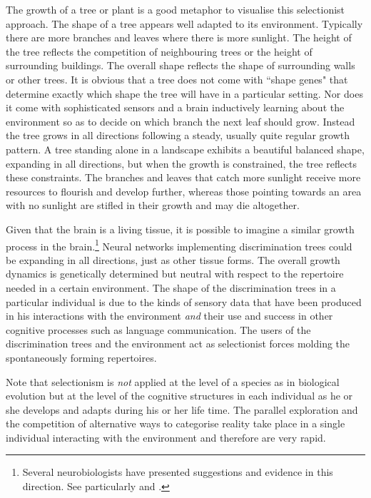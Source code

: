 The growth of a tree or plant is a good 
metaphor to visualise this selectionist approach. 
The shape of a tree appears well adapted to 
its environment. Typically there are more branches and leaves 
where there is more sunlight. The height of
the tree reflects the competition of neighbouring trees
or the height of surrounding buildings. The overall shape reflects
the shape of surrounding walls or other trees. 
It is obvious that a tree
does not come with ``shape genes" that determine
exactly which shape the tree will have in a particular 
setting. Nor does it come with sophisticated sensors
and a brain inductively learning about the environment
so as to decide on which branch the next leaf should grow. 
Instead the tree grows in all directions following
a steady, usually quite regular growth pattern. A tree
standing alone in a landscape exhibits a beautiful 
balanced shape, expanding in all directions, but when the 
growth is constrained, the tree reflects these constraints. 
The branches and leaves that catch more sunlight receive more resources 
to flourish and develop further, whereas those 
pointing towards an area with no sunlight are stifled in 
their growth and may die altogether.  

Given that the brain is a living tissue, it is possible 
to imagine a similar growth process in the brain.\footnote{
Several neurobiologists have presented 
suggestions and evidence in this direction. See 
particularly \cite{Edelman:1987} and \cite{Changeux:1997}.}
Neural networks implementing discrimination trees could be expanding
in all directions, just as other
tissue forms. The overall growth dynamics is 
genetically determined but neutral with respect to 
the repertoire needed in a certain environment. 
The shape of the discrimination trees in a particular 
individual is due to the kinds of sensory 
data that have been produced in his interactions with
the environment {\itshape and} their use and success
in other cognitive processes such as language
communication. The
users of the discrimination trees and the environment act
as selectionist forces molding the spontaneously forming 
repertoires.

Note that selectionism is {\it not} applied at 
the level of a species as in biological evolution but 
at the level of the cognitive structures in each individual
as he or she develops and adapts during his or her life 
time. The parallel exploration and the competition of 
alternative ways to categorise reality take 
place in a single individual interacting with the environment
and therefore are very rapid.

